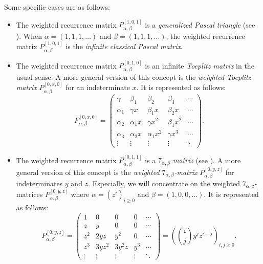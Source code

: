 \documentclass{amsart}
\begin{document}
Some specific cases are as follows:
\begin{itemize}
\item[(a)] The weighted recurrence matrix $P_{\alpha, \beta}^{[1, 0, 1]}$ is a {\em generalized Pascal triangle} (see \cite{Bach}). When $\alpha=(1, 1, 1, \ldots)$ and $\beta=(1, 1, 1, \ldots)$, the weighted recurrence matrix $P_{\alpha, \beta}^{[1, 0, 1]}$ is the {\em infinite classical Pascal matrix}.  
\item[(b)] The weighted recurrence matrix $P_{\alpha, \beta}^{[0, 1, 0]}$ is an infinite \emph{Toeplitz matrix} in the usual sense. A more general version of this concept is the \emph{weighted Toeplitz matrix} $P_{\alpha, \beta}^{[0, x, 0]}$ for an indeterminate $x$. It is represented as follows:
\[P_{\alpha, \beta}^{[0, x, 0]}=
\begin{pmatrix}
\gamma & \beta_1 &  \beta_2 &  \beta_3 & \cdots \\
\alpha_1 & \gamma x &  \beta_1 x &  \beta_2 x & \cdots \\
\alpha_2 & \alpha_1 x & \gamma x^2 &  \beta_1 x^2 & \cdots \\
\alpha_3 & \alpha_2 x &  \alpha_1 x^2 &  \gamma x^3 & \cdots \\
\vdots & \vdots & \vdots & \vdots & \ddots
\end{pmatrix}.
\]

\item[(c)] The weighted recurrence matrix $P_{\alpha, \beta}^{[0, 1, 1]}$ is a {\em $7_{\alpha, \beta}$-matrix} (see \cite{JZ}). A more general version of this concept is the \emph{weighted $7_{\alpha, \beta}$-matrix} $P_{\alpha, \beta}^{[0, y, z]}$ for indeterminates $y$ and $z$. Especially, we will concentrate on the weighted $7_{\alpha, \beta}$-matrices $P_{\alpha, \beta}^{[0, y, z]}$ where $\alpha=(z^i)_{i\geq 0}$ and  $\beta=(1, 0, 0, \ldots)$. It is represented as follows:
\[P_{\alpha, \beta}^{[0, y, z]}=
\begin{pmatrix}
1 & 0 & 0 & 0 & \cdots \\
z & y & 0 & 0 & \cdots \\
z^2 & 2yz & y^2 & 0 & \cdots \\
z^3 & 3yz^2 & 3y^2z & y^3& \cdots \\
\vdots & \vdots & \vdots & \vdots & \ddots
\end{pmatrix}=\left( \binom{i}{j} y^jz^{i-j}\right)_{i, j\geq 0}.
\]
\end{itemize}
\end{document}
